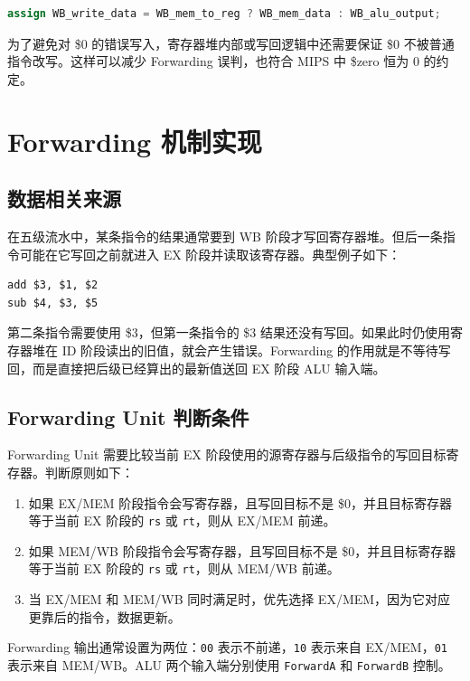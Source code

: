 \documentclass[UTF8,zihao=-4]{ctexart}
\begin{document}
\begin{lstlisting}[language=Verilog]
assign WB_write_data = WB_mem_to_reg ? WB_mem_data : WB_alu_output;
\end{lstlisting}

为了避免对 \$0 的错误写入，寄存器堆内部或写回逻辑中还需要保证 \$0 不被普通指令改写。这样可以减少 Forwarding 误判，也符合 MIPS 中 \$zero 恒为 0 的约定。

\section{Forwarding 机制实现}

\subsection{数据相关来源}

在五级流水中，某条指令的结果通常要到 WB 阶段才写回寄存器堆。但后一条指令可能在它写回之前就进入 EX 阶段并读取该寄存器。典型例子如下：

\begin{lstlisting}[language={}]
add $3, $1, $2
sub $4, $3, $5
\end{lstlisting}

第二条指令需要使用 \$3，但第一条指令的 \$3 结果还没有写回。如果此时仍使用寄存器堆在 ID 阶段读出的旧值，就会产生错误。Forwarding 的作用就是不等待写回，而是直接把后级已经算出的最新值送回 EX 阶段 ALU 输入端。

\subsection{Forwarding Unit 判断条件}

Forwarding Unit 需要比较当前 EX 阶段使用的源寄存器与后级指令的写回目标寄存器。判断原则如下：

\begin{enumerate}[label=\arabic*.]
  \item 如果 EX/MEM 阶段指令会写寄存器，且写回目标不是 \$0，并且目标寄存器等于当前 EX 阶段的 \texttt{rs} 或 \texttt{rt}，则从 EX/MEM 前递。
  \item 如果 MEM/WB 阶段指令会写寄存器，且写回目标不是 \$0，并且目标寄存器等于当前 EX 阶段的 \texttt{rs} 或 \texttt{rt}，则从 MEM/WB 前递。
  \item 当 EX/MEM 和 MEM/WB 同时满足时，优先选择 EX/MEM，因为它对应更靠后的指令，数据更新。
\end{enumerate}

Forwarding 输出通常设置为两位：\texttt{00} 表示不前递，\texttt{10} 表示来自 EX/MEM，\texttt{01} 表示来自 MEM/WB。ALU 两个输入端分别使用 \texttt{ForwardA} 和 \texttt{ForwardB} 控制。
\end{document}
